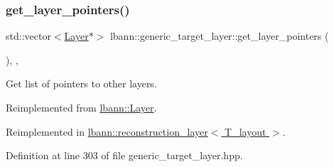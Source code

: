 \subsubsection{\texorpdfstring{get\+\_\+layer\+\_\+pointers()}{get\_layer\_pointers()}}
{\footnotesize\ttfamily std\+::vector$<$\hyperlink{classlbann_1_1Layer}{Layer}$\ast$$>$ lbann\+::generic\+\_\+target\+\_\+layer\+::get\+\_\+layer\+\_\+pointers (\begin{DoxyParamCaption}{ }\end{DoxyParamCaption})\hspace{0.3cm}{\ttfamily [inline]}, {\ttfamily [override]}, {\ttfamily [virtual]}}

Get list of pointers to other layers. 

Reimplemented from \hyperlink{classlbann_1_1Layer_a9f94210cbb973f1df89ef649899094a1}{lbann\+::\+Layer}.



Reimplemented in \hyperlink{classlbann_1_1reconstruction__layer_a52f5ebe2f2716b8cab5e768b1b82c3d0}{lbann\+::reconstruction\+\_\+layer$<$ T\+\_\+layout $>$}.



Definition at line 303 of file generic\+\_\+target\+\_\+layer.\+hpp.


